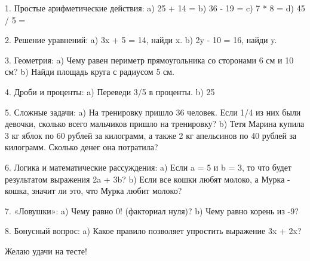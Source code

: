 \documentclass{article}
\begin{document}
1. Простые арифметические действия:
   a) 25 + 14 =
   b) 36 - 19 =
   c) 7 * 8 =
   d) 45 / 5 =

2. Решение уравнений:
   a) 3x + 5 = 14, найди x.
   b) 2y - 10 = 16, найди y.

3. Геометрия:
   a) Чему равен периметр прямоугольника со сторонами 6 см и 10 см?
   b) Найди площадь круга с радиусом 5 см.

4. Дроби и проценты:
   a) Переведи 3/5 в проценты.
   b) 25%

5. Сложные задачи:
   a) На тренировку пришло 36 человек. Если 1/4 из них были девочки, сколько всего мальчиков пришло на тренировку?
   b) Тетя Марина купила 3 кг яблок по 60 рублей за килограмм, а также 2 кг апельсинов по 40 рублей за килограмм. Сколько денег она потратила?

6. Логика и математические рассуждения:
   a) Если a = 5 и b = 3, то что будет результатом выражения 2a + 3b?
   b) Если все кошки любят молоко, а Мурка - кошка, значит ли это, что Мурка любит молоко?

7. «Ловушки»:
   a) Чему равно 0! (факториал нуля)?
   b) Чему равно корень из -9?

8. Бонусный вопрос:
   a) Какое правило позволяет упростить выражение 3x + 2x?

Желаю удачи на тесте!
\end{document}
